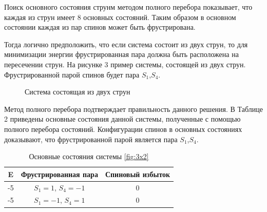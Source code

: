 \documentclass[utf8, babel, sor, jor, amsmath,amssymb, reprint]{elsarticle} %
\begin{document}
Поиск основного состояния струнм методом полного перебора показывает, что каждая из струн имеет 8 основных состояний. Таким образом в основном состоянии каждая из пар спинов может быть фрустрирована.

Тогда логично предположить, что если система состоит из двух струн, то для минимизации энергии фрустрированная пара должна быть расположена на пересечении струн. На рисунке 3 пример системы, состоящей из двух струн. Фрустрированной парой спинов будет пара $S_1$,$S_4$.

\begin{figure}[h]
	\centering
	\caption{Система состоящая из двух струн}
	\label{fig:3x2}
\end{figure}

Метод полного перебора подтверждает правильность данного решения. В Таблице 2 приведены основные состояния данной системы, полученные с помощью полного перебора состояний. Конфигурации спинов в основных состояниях доказывают, что фрустрированной парой является пара $S_1$,$S_4$. 

\begin{table}[h]
	\centering
	\begin{tabular}{|c|c|c|}
		\hline
		 E   &   Фрустрированная пара & Спиновый избыток\\
		 \hline
		-5   &  $S_1=1$, $S_4=-1$ & 0 \\
		\hline
		-5   &   $S_1=-1$, $S_4=1$ & 0 \\
		\hline
	\end{tabular}
	\caption{Основные состояния системы \eqref{fig:3x2} }
	\label{tab:gs}
\end{table}
\end{document}
